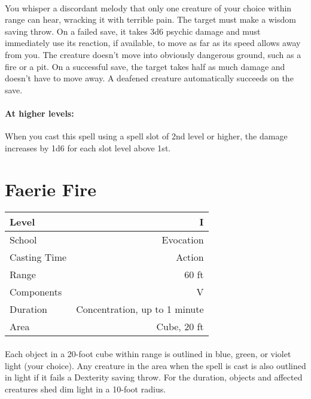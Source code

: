 \documentclass[a5paper,12pt]{article}
\begin{document}
\paragraph{}
You whisper a discordant melody that only one creature of your choice within range can hear, wracking it with terrible pain. The target must make a wisdom saving throw. On a failed save, it takes 3d6 psychic damage and must immediately use its reaction, if available, to move as far as its speed allows away from you. The creature doesn’t move into obviously dangerous ground, such as a fire or a pit. On a successful save, the target takes half as much damage and doesn’t have to move away. A deafened creature automatically succeeds on the save.

\paragraph{At higher levels:}
When you cast this spell using a spell slot of 2nd level or higher, the damage increases by 1d6 for each slot level above 1st.

\newpage

\section*{Faerie Fire}
\begin{table}[h]
   \centering
   \begin{tabular}{|l|r|}
      \hline
      Level        & I \\
      \hline
      School       & Evocation \\
      \hline
      Casting Time & Action \\
      \hline
      Range        & 60 ft \\
      \hline
      Components   & V \\
      \hline
      Duration     & Concentration, up to 1 minute\\
      \hline
      Area         & Cube, 20 ft \\
      \hline
   \end{tabular}
\end{table}

\paragraph{}
Each object in a 20-foot cube within range is outlined in blue, green, or violet light (your choice). Any creature in the area when the spell is cast is also outlined in light if it fails a Dexterity saving throw. For the duration, objects and affected creatures shed dim light in a 10-foot radius.
\end{document}

